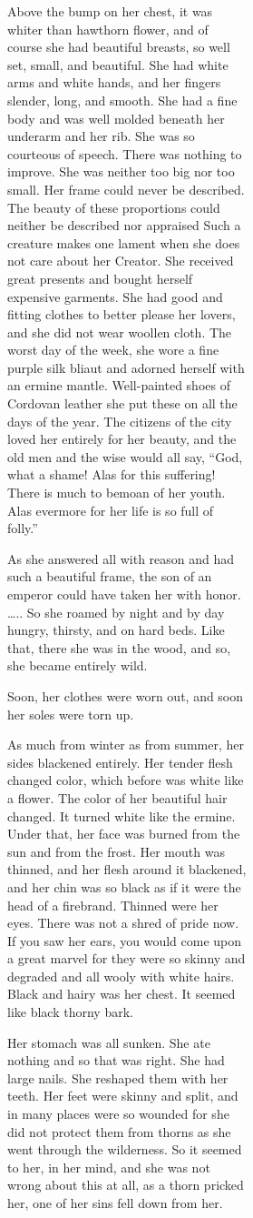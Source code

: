 \documentclass[
  letterpaper,
  DIV=11,
  numbers=noendperiod,
  oneside]{scrreprt}
\begin{document}
\begin{figure}
\begin{figure}
\begin{figure}
\begin{minipage}{0.20\linewidth}
{Above the bump on her chest,} {it was {whiter than hawthorn flower},}
{and of course she had beautiful breasts,} {so well set, small, and
beautiful.} {She had {white arms} and {white hands},} {and her fingers
slender, long, and smooth.} {She had a fine body and was well molded}
{beneath her underarm and her rib.} {She was so courteous of speech.}
{There was nothing to improve.} {She was neither too big nor too small.}
{Her frame could never be described.} {The beauty of these
{proportions}} {could neither be described nor {appraised}} Such a
creature makes one lament when she does not care about her Creator. She
received great presents and bought herself expensive garments. She had
good and fitting clothes to better please her lovers, and she did not
{wear} woollen cloth. The worst day of the week, she wore a fine {purple
silk} bliaut and adorned herself with an ermine mantle. {Well-painted}
shoes of Cordovan leather she put these on all the days of the year. The
citizens of the city loved her entirely for her beauty, and the old men
and the wise would all say, ``God, what a shame! Alas for this
suffering! There is much to bemoan of her youth. Alas evermore for her
life is so full of folly.''

As she answered all with reason and had such a beautiful frame, the son
of an emperor could have taken her with honor. \ldots.. So she roamed
{by night and by day} hungry, thirsty, and on hard beds. Like that,
there she was in the wood, and so, she became entirely wild.

Soon, her clothes were worn out, and soon her soles were torn up.

{As much from winter as from summer,} {her sides {blackened} entirely.}
{Her tender flesh {changed color},} {which before was {white like a
flower}.} {The color of her beautiful hair changed.} {It turned white
like the ermine.} Under that, her face was {burned} from the sun and
from the frost. Her mouth was thinned, and her flesh around it
{blackened,} and her chin was so {black} {as if it were the head of a
firebrand.} {Thinned} were her eyes. There was not a shred of pride now.
If you saw her ears, you would come upon a great marvel for they were so
skinny and degraded and all wooly with {white} hairs. {Black} and hairy
was her chest. It seemed like {black} thorny bark.

{Her stomach was all sunken.} {She ate nothing and so that was right.}
{She had large nails.} {She reshaped them with her teeth.} Her feet were
skinny and split, and in many places were so wounded for she did not
protect them from thorns as she went through the wilderness. So it
seemed to her, in her mind, and she was not wrong about this at all, {as
a thorn pricked her,} {one of her sins fell down from her.}


\end{minipage}
\end{figure}
\end{figure}
\end{figure}
\end{document}
